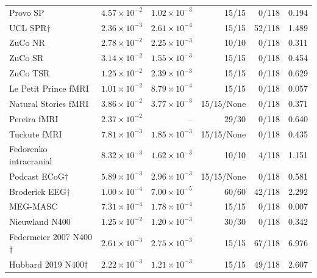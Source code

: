 {\begin{longtable}{@{}lrrrrr@{}}
Provo SP & $4.57\times10^{-2}$ & $1.02\times10^{-3}$ & 15/15 & 0/118 & 0.194 \\
UCL SPR$\dagger$ & $2.36\times10^{-3}$ & $2.61\times10^{-4}$ & 15/15 & 52/118 & 1.489 \\
ZuCo NR & $2.78\times10^{-2}$ & $2.25\times10^{-3}$ & 10/10 & 0/118 & 0.311 \\
ZuCo SR & $3.14\times10^{-2}$ & $1.55\times10^{-3}$ & 15/15 & 0/118 & 0.454 \\
ZuCo TSR & $1.25\times10^{-2}$ & $2.39\times10^{-3}$ & 15/15 & 0/118 & 0.629 \\
Le Petit Prince fMRI & $1.01\times10^{-2}$ & $8.79\times10^{-4}$ & 15/15 & 0/118 & 0.057 \\
Natural Stories fMRI & $3.86\times10^{-2}$ & $3.77\times10^{-3}$ & 15/15/None & 0/118 & 0.371 \\
Pereira fMRI & $2.37\times10^{-2}$ & -- & 29/30 & 0/118 & 0.640 \\
Tuckute fMRI & $7.81\times10^{-3}$ & $1.85\times10^{-3}$ & 15/15/None & 0/118 & 0.435 \\
Fedorenko intracranial & $8.32\times10^{-3}$ & $1.62\times10^{-3}$ & 10/10 & 4/118 & 1.151 \\
Podcast ECoG$\dagger$ & $5.89\times10^{-3}$ & $2.96\times10^{-3}$ & 15/15/None & 0/118 & 0.581 \\
Broderick EEG$\dagger$ & $1.00\times10^{-4}$ & $7.00\times10^{-5}$ & 60/60 & 42/118 & 2.292 \\
MEG-MASC & $7.31\times10^{-4}$ & $1.78\times10^{-4}$ & 15/15 & 0/118 & 0.007 \\
Nieuwland N400 & $1.25\times10^{-2}$ & $1.20\times10^{-3}$ & 30/30 & 0/118 & 0.342 \\
Federmeier 2007 N400$\dagger$ & $2.61\times10^{-3}$ & $2.75\times10^{-3}$ & 15/15 & 67/118 & 6.976 \\
Hubbard 2019 N400$\dagger$ & $2.22\times10^{-3}$ & $1.21\times10^{-3}$ & 15/15 & 49/118 & 2.607 \\
\end{longtable}
}
